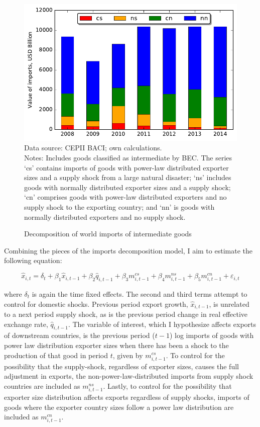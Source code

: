 \documentclass[10pt,letterpaper]{article}
\begin{document}
\begin{figure} \label{fig:tot_decomp}
  \caption{Decomposition of world imports of intermediate goods}
  {\centering
\includegraphics[scale=0.8]{plots/tot_decomp.pdf} \\
\footnotesize{Data source: CEPII BACI; own calculations. \\
Notes: Includes goods classified as intermediate by BEC. The series `cs' contains imports of goods with power-law distributed exporter sizes and a supply shock from a large natural disaster; `ns' includes goods with normally distributed exporter sizes and a supply shock; `cn' comprises goods with power-law distributed exporters and no supply shock to the exporting country; and `nn' is goods with normally distributed exporters and no supply shock.}}
\end{figure}

Combining the pieces of the imports decomposition model, I aim to estimate the following equation:

\begin{equation} \label{eq:decomp_est}
\hat{x}_{i,t} = \delta_{t} + \beta_1 \hat{x}_{i,t-1} + \beta_2 \hat{q}_{i,t-1} + \beta_3 m^{cs}_{i,t-1} + \beta_4 m^{ns}_{i,t-1} + \beta_5 m^{cn}_{i,t-1} + \varepsilon_{i,t}
\end{equation}

where $\delta_t$ is again the time fixed effects. The second and third terms attempt to control for domestic shocks. Previous period export growth, $\hat{x}_{i,t-1}$,  is unrelated to a next period supply shock, as is the previous period change in real effective exchange rate, $\hat{q}_{i,t-1}$. The variable of interest, which I hypothesize affects exports of downstream countries, is the previous period ($t-1$) log imports of goods with power law distribution exporter sizes when there has been a shock to the production of that good in period $t$, given by $m^{cs}_{i,t-1}$. To control for the possibility that the supply-shock, regardless of exporter sizes, causes the full adjustment in exports, the non-power-law-distributed imports from supply shock countries are included as $m^{ns}_{i,t-1}$. Lastly, to control for the possibility that exporter size distribution affects exports regardless of supply shocks, imports of goods where the exporter country sizes follow a power law distribution are included as $m^{cn}_{i,t-1}$.
\end{document}
